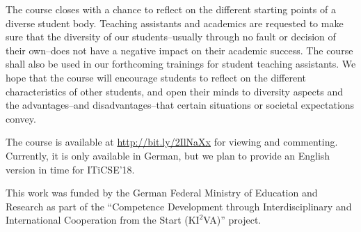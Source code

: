 \documentclass[sigconf,screen]{acmart}
\begin{document}
The course closes with a chance to reflect on the different starting points of a diverse
student body. Teaching assistants and academics are requested to make sure that the diversity of our
students--usually through no fault or decision of their own--does not have a negative
impact on their academic success. The course shall also be used in our forthcoming
trainings for student teaching assistants. We hope that the course will encourage students to reflect
on the different characteristics of other students, and open their minds to diversity aspects and the
advantages--and disadvantages--that certain situations or societal expectations convey.

The course is available at \url{http://bit.ly/2IlNaXx} for viewing and commenting. Currently, it is
only available in German, but we plan to provide an English version in time for ITiCSE'18.


\begin{acks}
This work was funded by the German Federal Ministry of Education and Research as part of the 
``Competence Development through Interdisciplinary and International Cooperation from the Start
(K$\mathrm{I^2}$VA)'' project.
\end{acks}


%
\end{document}
